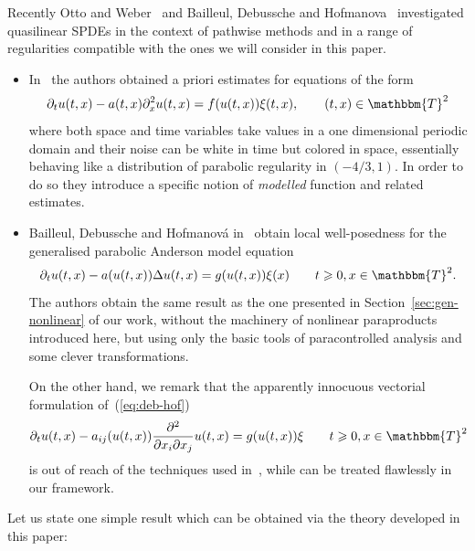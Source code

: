 \documentclass[11pt,reqno]{amsart}
\newcommand{\tmtextit}[1]{{\itshape{#1}}}
\newenvironment{itemizedot}{\begin{itemize} \renewcommand{\labelitemi}{$\bullet$}\renewcommand{\labelitemii}{$\bullet$}\renewcommand{\labelitemiii}{$\bullet$}\renewcommand{\labelitemiv}{$\bullet$}}{\end{itemize}}
\begin{document}
Recently Otto and Weber~{\cite{otto_quasilinear_2016}} and Bailleul, Debussche
and Hofmanova~{\cite{hofmanova}} investigated quasilinear SPDEs in the context
of pathwise methods and in a range of regularities compatible with the ones we
will consider in this paper.
\begin{itemizedot}
  \item In~{\cite{otto_quasilinear_2016}} the authors obtained a priori
  estimates for equations of the form
  \[ \partial_t u (t, x) - a (t, x) \partial_x^2 u (t, x) = f (u (t, x)) \xi
     (t, x), \qquad (t, x) \in \mathbbm{T}^2 \]
  where both space and time variables take values in a one dimensional
  periodic domain and their noise can be white in time but colored in space,
  essentially behaving like a distribution of parabolic regularity in $(- 4 /
  3, 1)$. In order to do so they introduce a specific notion of
  \tmtextit{modelled} function and related estimates. \ \ \ \
  
  \item Bailleul, Debussche and Hofmanov{\'a} in~{\cite{hofmanova}} obtain
  local well-posedness for the generalised parabolic Anderson model equation
  \begin{equation}
    \partial_t u (t, x) - a (u (t, x)) \Delta u (t, x) = g (u (t, x)) \xi (x)
    \label{eq:deb-hof} \qquad t \geqslant 0, x \in \mathbbm{T}^2 .
  \end{equation}
  The authors obtain the same result as the one presented in
  Section~\ref{sec:gen-nonlinear} of our work, without the machinery of
  nonlinear paraproducts introduced here, but using only the basic tools of
  paracontrolled analysis and some clever transformations.
  
  On the other hand, we remark that the apparently innocuous vectorial
  formulation of~(\ref{eq:deb-hof})
  \[ \partial_t u (t, x) - a_{i j} (u (t, x)) \frac{\partial^2}{\partial x_i
     \partial x_j} u (t, x) = g (u (t, x)) \xi \qquad t \geqslant 0, x \in
     \mathbbm{T}^2 \]
  is out of reach of the techniques used in~{\cite{hofmanova}}, while can be
  treated flawlessly in our framework.
\end{itemizedot}


Let us state one simple result which can be obtained via the theory developed
in this paper:
\end{document}
